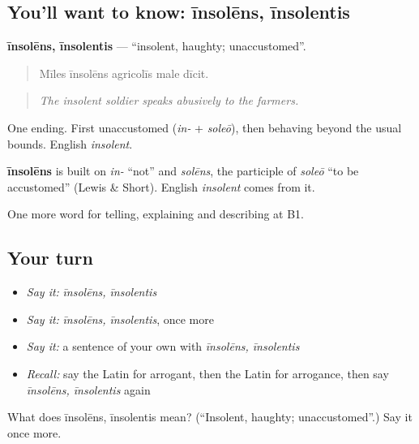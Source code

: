 \subsection*{You'll want to know: īnsolēns, īnsolentis}
\textbf{īnsolēns, īnsolentis} — \textquotedblleft{}insolent, haughty; unaccustomed\textquotedblright{}.

\begin{quote}
Mīles īnsolēns agricolīs male dīcit.
\end{quote}

\begin{quote}
\emph{The insolent soldier speaks abusively to the farmers.}
\end{quote}

One ending. First unaccustomed (\emph{in-} + \emph{soleō}), then behaving beyond the usual bounds. English \emph{insolent}.

\begin{cousinweb}
\textbf{īnsolēns} is built on \emph{in-} \textquotedblleft{}not\textquotedblright{} and \emph{solēns}, the participle of \emph{soleō} \textquotedblleft{}to be accustomed\textquotedblright{} (Lewis \& Short). English \emph{insolent} comes from it.
\end{cousinweb}

\begin{grammarlens}[title={What you've built}]
One more word for telling, explaining and describing at B1.
\end{grammarlens}

\subsection*{Your turn}
\begin{itemize}
\raggedright
  \item \emph{Say it:} \emph{īnsolēns, īnsolentis}
  \item \emph{Say it:} \emph{īnsolēns, īnsolentis}, once more
  \item \emph{Say it:} a sentence of your own with \emph{īnsolēns, īnsolentis}
  \item \emph{Recall:} say the Latin for arrogant, then the Latin for arrogance, then say \emph{īnsolēns, īnsolentis} again
\end{itemize}

\begin{tcolorbox}[breakable,colback=teal!4,colframe=teal!35!black,title={Before you move on}]
What does īnsolēns, īnsolentis mean? (\textquotedblleft{}Insolent, haughty; unaccustomed\textquotedblright{}.) Say it once more.
\end{tcolorbox}
